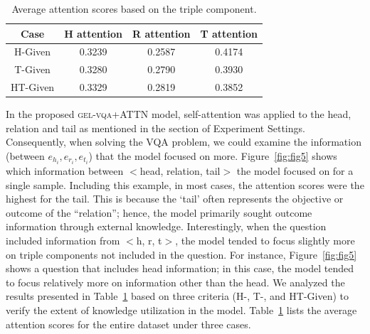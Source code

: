 \documentclass[letterpaper]{article} %
\begin{document}
\begin{table}[h]
\centering
\small

\begin{tabular}{cccc}
\toprule
Case              & H attention   & R attention  & T attention   \\
\midrule
H-Given           & 0.3239        & 0.2587       &0.4174       \\
T-Given           & 0.3280        & 0.2790       &0.3930         \\
HT-Given          & 0.3329        & 0.2819       &0.3852         \\
\bottomrule
\end{tabular}
\caption{Average attention scores based on the triple component.}
\label{tab:attn-score}
\end{table}

In the proposed \textsc{gel-vqa}+ATTN model, self-attention \cite{vaswani2017attention} was applied to the head, relation and tail as mentioned in the section of Experiment Settings.
Consequently, when solving the VQA problem, we could examine the information (between ${e_{h_i}, e_{r_i}, e_{t_i}}$) that the model focused on more. Figure~\ref{fig:fig5} shows which information between $<$head, relation, tail$>$ the model focused on for a single sample. Including this example, in most cases, the attention scores were the highest for the tail. This is because the `tail' often represents the objective or outcome of the ``relation''; hence, the model primarily sought outcome information through external knowledge. Interestingly, when the question included information from $<$h, r, t$>$, the model tended to focus slightly more on triple components not included in the question. For instance, Figure~\ref{fig:fig5} shows a question that includes head information; in this case, the model tended to focus relatively more on information other than the head.  We analyzed the results presented in Table~\ref{tab:attn-score} based on three criteria (H-, T-, and HT-Given) to verify the extent of knowledge utilization in the model. Table~\ref{tab:attn-score} lists the average attention scores for the entire dataset under three cases.
\end{document}
